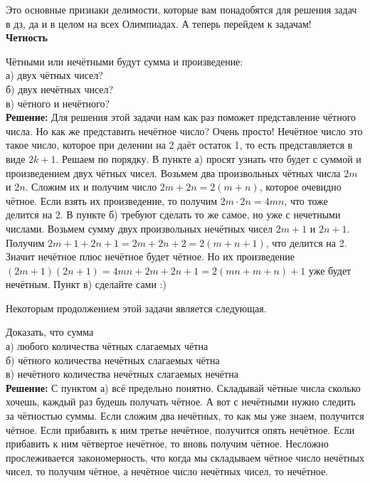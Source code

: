 Это основные признаки делимости, которые вам понадобятся для решения задач в дз, да и в целом на всех Олимпиадах. А теперь перейдем к задачам!\\

\noindent\textbf{\Large{Четность}}

Чётными или нечётными будут сумма и произведение:\\
а) двух чётных чисел?\\
б) двух нечётных чисел?\\
в) чётного и нечётного?\\

\textbf{Решение:} Для решения этой задачи нам как раз поможет представление чётного числа. Но как же представить нечётное число? Очень просто! Нечётное число это такое число, которое при делении на 2 даёт остаток 1, то есть представляется в виде $2k+1$. Решаем по порядку. В пункте а) просят узнать что будет с суммой и произведением двух чётных чисел. Возьмем два произвольных чётных числа $2m$ и $2n$. Сложим их и получим число $2m+2n = 2(m+n)$, которое очевидно чётное. Если взять их произведение, то получим $2m\cdot2n=4mn$, что тоже делится на 2. В пункте б) требуют сделать то же самое, но уже с нечетными числами. Возьмем сумму двух произвольных нечётных чисел $2m+1$ и $2n+1$. Получим $2m+1+2n+1=2m+2n+2=2(m+n+1)$, что делится на 2. Значит нечётное плюс нечётное будет чётное. Но их произведение $(2m+1)(2n+1)=4mn+2m+2n+1=2(mn+m+n)+1$ уже будет нечётным. Пункт в) сделайте сами :)

Некоторым продолжением этой задачи является следующая. 

 Доказать, что сумма\\
а) любого количества чётных слагаемых чётна\\
б) чётного количества нечётных слагаемых чётна\\
в) нечётного количества нечётных слагаемых нечётна\\

\textbf{Решение:} С пунктом а) всё предельно понятно. Складывай чётные числа сколько хочешь, каждый раз будешь получать чётное. А вот с нечётными нужно следить за чётностью суммы. Если сложим два нечётных, то как мы уже знаем, получится чётное. Если прибавить к ним третье нечётное, получится опять нечётное. Если прибавить к ним чётвертое нечётное, то вновь получим чётное. Несложно прослеживается закономерность, что когда мы складываем чётное число нечётных чисел, то получим чётное, а нечётное число нечётных чисел, то нечётное.

